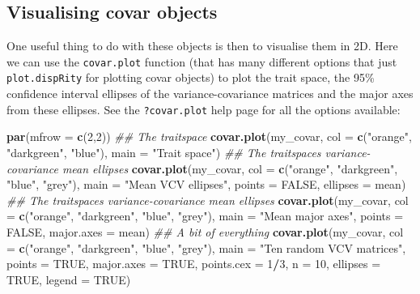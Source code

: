 \documentclass[
]{book}
\newenvironment{Shaded}{\begin{snugshade}}{\end{snugshade}}
\newcommand{\CommentTok}[1]{\textcolor[rgb]{0.56,0.35,0.01}{\textit{#1}}}
\newcommand{\DataTypeTok}[1]{\textcolor[rgb]{0.13,0.29,0.53}{#1}}
\newcommand{\DecValTok}[1]{\textcolor[rgb]{0.00,0.00,0.81}{#1}}
\newcommand{\KeywordTok}[1]{\textcolor[rgb]{0.13,0.29,0.53}{\textbf{#1}}}
\newcommand{\NormalTok}[1]{#1}
\newcommand{\OperatorTok}[1]{\textcolor[rgb]{0.81,0.36,0.00}{\textbf{#1}}}
\newcommand{\OtherTok}[1]{\textcolor[rgb]{0.56,0.35,0.01}{#1}}
\newcommand{\StringTok}[1]{\textcolor[rgb]{0.31,0.60,0.02}{#1}}
\begin{document}
\hypertarget{visualising-covar-objects}{%
\subsection{Visualising covar objects}\label{visualising-covar-objects}}

One useful thing to do with these objects is then to visualise them in 2D.
Here we can use the \texttt{covar.plot} function (that has many different options that just \texttt{plot.dispRity} for plotting covar objects) to plot the trait space, the 95\% confidence interval ellipses of the variance-covariance matrices and the major axes from these ellipses.
See the \texttt{?covar.plot} help page for all the options available:

\begin{Shaded}
\begin{Highlighting}[]
\KeywordTok{par}\NormalTok{(}\DataTypeTok{mfrow =} \KeywordTok{c}\NormalTok{(}\DecValTok{2}\NormalTok{,}\DecValTok{2}\NormalTok{))}
\CommentTok{\#\# The traitspace}
\KeywordTok{covar.plot}\NormalTok{(my\_covar, }\DataTypeTok{col =} \KeywordTok{c}\NormalTok{(}\StringTok{"orange"}\NormalTok{, }\StringTok{"darkgreen"}\NormalTok{, }\StringTok{"blue"}\NormalTok{), }\DataTypeTok{main =} \StringTok{"Trait space"}\NormalTok{)}
\CommentTok{\#\# The traitspace\textquotesingle{}s variance{-}covariance mean ellipses}
\KeywordTok{covar.plot}\NormalTok{(my\_covar, }\DataTypeTok{col =} \KeywordTok{c}\NormalTok{(}\StringTok{"orange"}\NormalTok{, }\StringTok{"darkgreen"}\NormalTok{, }\StringTok{"blue"}\NormalTok{, }\StringTok{"grey"}\NormalTok{), }\DataTypeTok{main =} \StringTok{"Mean VCV ellipses"}\NormalTok{,}
           \DataTypeTok{points =} \OtherTok{FALSE}\NormalTok{, }\DataTypeTok{ellipses =}\NormalTok{ mean) }
\CommentTok{\#\# The traitspace\textquotesingle{}s variance{-}covariance mean ellipses}
\KeywordTok{covar.plot}\NormalTok{(my\_covar, }\DataTypeTok{col =} \KeywordTok{c}\NormalTok{(}\StringTok{"orange"}\NormalTok{, }\StringTok{"darkgreen"}\NormalTok{, }\StringTok{"blue"}\NormalTok{, }\StringTok{"grey"}\NormalTok{), }\DataTypeTok{main =} \StringTok{"Mean major axes"}\NormalTok{,}
           \DataTypeTok{points =} \OtherTok{FALSE}\NormalTok{, }\DataTypeTok{major.axes =}\NormalTok{ mean)}
\CommentTok{\#\# A bit of everything}
\KeywordTok{covar.plot}\NormalTok{(my\_covar, }\DataTypeTok{col =} \KeywordTok{c}\NormalTok{(}\StringTok{"orange"}\NormalTok{, }\StringTok{"darkgreen"}\NormalTok{, }\StringTok{"blue"}\NormalTok{, }\StringTok{"grey"}\NormalTok{), }\DataTypeTok{main =} \StringTok{"Ten random VCV matrices"}\NormalTok{,}
           \DataTypeTok{points =} \OtherTok{TRUE}\NormalTok{, }\DataTypeTok{major.axes =} \OtherTok{TRUE}\NormalTok{, }\DataTypeTok{points.cex =} \DecValTok{1}\OperatorTok{/}\DecValTok{3}\NormalTok{, }\DataTypeTok{n =} \DecValTok{10}\NormalTok{, }\DataTypeTok{ellipses =} \OtherTok{TRUE}\NormalTok{, }\DataTypeTok{legend =} \OtherTok{TRUE}\NormalTok{)}
\end{Highlighting}
\end{Shaded}
\end{document}
